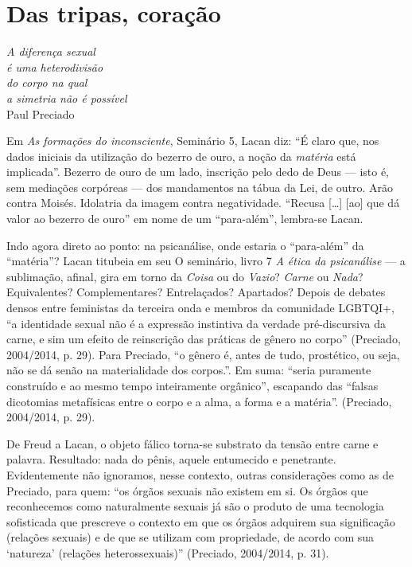\section{Das tripas, coração}

\begin{flushright}
\footnotesize
\emph{A diferença sexual\\
é uma heterodivisão\\
do corpo na qual\\
a simetria não é possível}\\
Paul Preciado
\end{flushright}

Em \emph{As formações do inconsciente}, Seminário 5, Lacan diz: ``É
claro que, nos dados iniciais da utilização do bezerro de ouro, a noção
da \emph{matéria} está implicada''. Bezerro de ouro de um lado,
inscrição pelo dedo de Deus --- isto é, sem mediações corpóreas --- dos
mandamentos na tábua da Lei, de outro. Arão contra Moisés. Idolatria da
imagem contra negatividade. ``Recusa {[}\ldots{}{]} {[}ao{]} que dá valor ao
bezerro de ouro'' em nome de um ``para-além'', lembra-se Lacan.

Indo agora direto ao ponto: na psicanálise, onde estaria o ``para-além''
da ``matéria''? Lacan titubeia em seu O seminário, livro 7 \emph{A ética
da psicanálise} --- a sublimação, afinal, gira em torno da \emph{Coisa}
ou do \emph{Vazio}? \emph{Carne} ou \emph{Nada}? Equivalentes?
Complementares? Entrelaçados? Apartados? Depois de debates densos entre
feministas da terceira onda e membros da comunidade LGBTQI+, ``a
identidade sexual não é a expressão instintiva da verdade pré-discursiva
da carne, e sim um efeito de reinscrição das práticas de gênero no
corpo'' (Preciado, 2004/2014, p. 29). Para Preciado, ``o gênero é, antes
de tudo, prostético, ou seja, não se dá senão na materialidade dos
corpos.''. Em suma: ``seria puramente construído e ao mesmo tempo
inteiramente orgânico'', escapando das ``falsas dicotomias metafísicas
entre o corpo e a alma, a forma e a matéria''. (Preciado, 2004/2014, p.
29).

De Freud a Lacan, o objeto fálico torna-se substrato da tensão entre
carne e palavra. Resultado: nada do pênis, aquele entumecido e
penetrante. Evidentemente não ignoramos, nesse contexto, outras
considerações como as de Preciado, para quem: ``os órgãos sexuais não
existem em si. Os órgãos que reconhecemos como naturalmente sexuais já
são o produto de uma tecnologia sofisticada que prescreve o contexto em
que os órgãos adquirem sua significação (relações sexuais) e de que se
utilizam com propriedade, de acordo com sua `natureza' (relações
heterossexuais)'' (Preciado, 2004/2014, p. 31).

